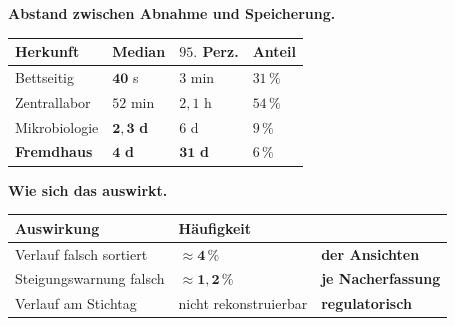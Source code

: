 \begin{merksatz}
\textbf{Abstand zwischen Abnahme und Speicherung.}

\begin{center}
{\small
\renewcommand{\arraystretch}{1.45}
\begin{tabular}{@{}P{2.8cm}P{2.0cm}P{2.0cm}P{2.0cm}@{}}
\toprule
\textbf{Herkunft} & \textbf{Median} & \textbf{$95.$ Perz.} & \textbf{Anteil}\\
\midrule
Bettseitig & $\mathbf{40}$ s & $3$ min & $31\,\%$\\
Zentrallabor & $52$ min & $2{,}1$ h & $54\,\%$\\
Mikrobiologie & $\mathbf{2{,}3}$ \textbf{d} & $6$ d & $9\,\%$\\
\textbf{Fremdhaus} & \textcolor{akzent}{$\mathbf{4}$ \textbf{d}} & \textcolor{akzent}{$\mathbf{31}$ \textbf{d}} & $6\,\%$\\
\bottomrule
\end{tabular}}
\end{center}

\begin{center}
\begin{minipage}{0.88\textwidth}
\end{minipage}
\end{center}

\textbf{Wie sich das auswirkt.}

\begin{center}
\renewcommand{\arraystretch}{1.45}
\begin{tabular}{@{}P{3.0cm}P{2.2cm}P{2.6cm}@{}}
\toprule
\textbf{Auswirkung} & \textbf{Häufigkeit} & \\
\midrule
Verlauf falsch sortiert & $\approx\mathbf{4\,\%}$ & \textbf{der Ansichten}\\
Steigungs\-warnung falsch & $\approx\mathbf{1{,}2\,\%}$ & \textcolor{akzent}{\textbf{je Nacherfassung}}\\
Verlauf am Stichtag & \textcolor{akzent}{nicht rekonstruierbar} & \textcolor{akzent}{\textbf{regulatorisch}}\\
\bottomrule
\end{tabular}
\end{center}

\begin{center}
\end{center}
\end{merksatz}

